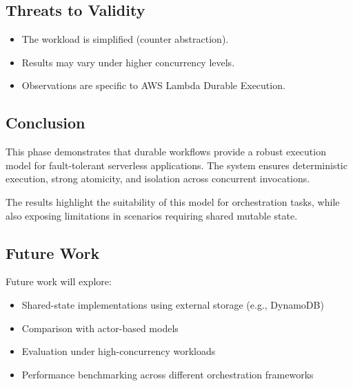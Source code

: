 \subsection{Threats to Validity}

\begin{itemize}
    \item The workload is simplified (counter abstraction).
    \item Results may vary under higher concurrency levels.
    \item Observations are specific to AWS Lambda Durable Execution.
\end{itemize}

\subsection{Conclusion}

This phase demonstrates that durable workflows provide a robust execution model for fault-tolerant serverless applications. The system ensures deterministic execution, strong atomicity, and isolation across concurrent invocations.

The results highlight the suitability of this model for orchestration tasks, while also exposing limitations in scenarios requiring shared mutable state.

\subsection{Future Work}

Future work will explore:

\begin{itemize}
    \item Shared-state implementations using external storage (e.g., DynamoDB)
    \item Comparison with actor-based models
    \item Evaluation under high-concurrency workloads
    \item Performance benchmarking across different orchestration frameworks
\end{itemize}

